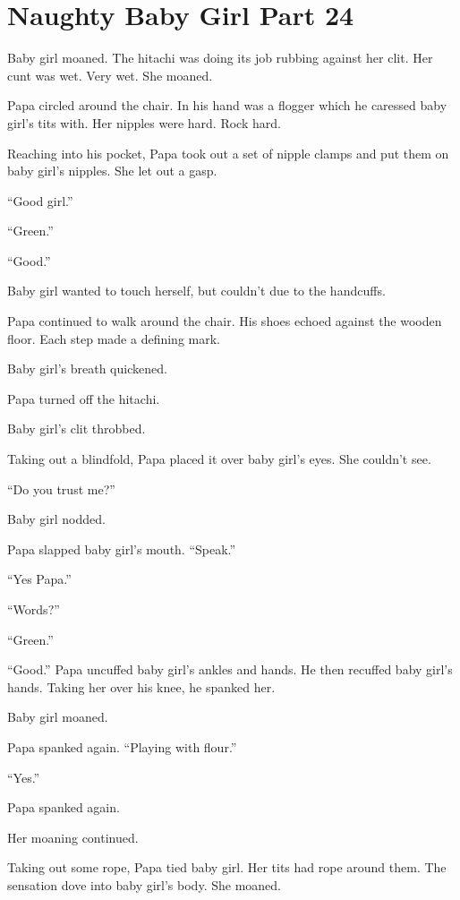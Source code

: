 \section{Naughty Baby Girl Part 24}



    Baby girl moaned. The hitachi was doing its job rubbing against her clit. Her cunt was wet. Very wet. She moaned.

    Papa circled around the chair. In his hand was a flogger which he caressed baby girl’s tits with. Her nipples were hard. Rock hard.

    Reaching into his pocket, Papa took out a set of nipple clamps and put them on baby girl’s nipples. She let out a gasp.

    “Good girl.”

    “Green.”

    “Good.”

    Baby girl wanted to touch herself, but couldn’t due to the handcuffs.

    Papa continued to walk around the chair. His shoes echoed against the wooden floor. Each step made a defining mark.

    Baby girl’s breath quickened.

    Papa turned off the hitachi.

    Baby girl’s clit throbbed.

    Taking out a blindfold, Papa placed it over baby girl’s eyes. She couldn’t see.

    “Do you trust me?”

    Baby girl nodded.

    Papa slapped baby girl’s mouth. “Speak.”

    “Yes Papa.”

    “Words?”

    “Green.”

    “Good.” Papa uncuffed baby girl’s ankles and hands. He then recuffed baby girl’s hands. Taking her over his knee, he spanked her.

    Baby girl moaned.

    Papa spanked again. “Playing with flour.”

    “Yes.”

    Papa spanked again.

    Her moaning continued.

    Taking out some rope, Papa tied baby girl. Her tits had rope around them. The sensation dove into baby girl’s body. She moaned.

